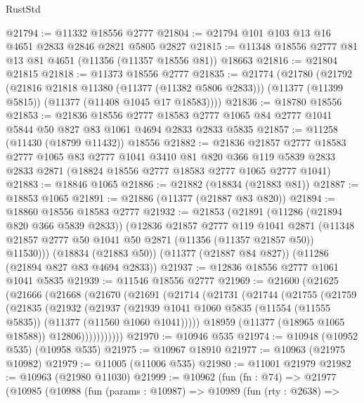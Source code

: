 \begin{lexlean}{RustStd}
\begin{coremodule}
@21794 := @11332 @18556 @2777
@21804 := @21794 @101 @103 @13 @16 @4651 @2833 @2846 @2821 @5805 @2827
@21815 := @11348 @18556 @2777 @81 @13 @81 @4651 (@11356 (@11357 @18556 @81)) @18663
@21816 := @21804 @21815
@21818 := @11373 @18556 @2777
@21835 := @21774
    (@21780
      (@21792
        (@21816 @21818 @11380 (@11377 (@11382 @5806 @2833)))
        (@11377 (@11399 @5815))
        (@11377 (@11408 @1045 @17 @18583))))
@21836 := @18780 @18556
@21853 := @21836
    @18556
    @2777
    @18583
    @2777
    @1065
    @84
    @2777
    @1041
    @5844
    @50
    @827
    @83
    @1061
    @4694
    @2833
    @2833
    @5835
@21857 := @11258 (@11430 (@18799 @11432)) @18556
@21882 := @21836
    @21857
    @2777
    @18583
    @2777
    @1065
    @83
    @2777
    @1041
    @3410
    @81
    @820
    @366
    @119
    @5839
    @2833
    @2833
    @2871
    (@18824 @18556 @2777 @18583 @2777 @1065 @2777 @1041)
@21883 := @18846 @1065
@21886 := @21882 (@18834 (@21883 @81))
@21887 := @18853 @1065
@21891 := @21886 (@11377 (@21887 @83 @820))
@21894 := @18860 @18556 @18583 @2777
@21932 := @21853
    (@21891
      (@11286 (@21894 @820 @366 @5839 @2833))
      (@12836
        @21857
        @2777
        @119
        @1041
        @2871
        (@11348 @21857 @2777 @50 @1041 @50 @2871 (@11356 (@11357 @21857 @50)) @11530)))
    (@18834 (@21883 @50))
    (@11377 (@21887 @84 @827))
    (@11286 (@21894 @827 @83 @4694 @2833))
@21937 := @12836 @18556 @2777 @1061 @1041 @5835
@21939 := @11546 @18556 @2777
@21969 := @21600
    (@21625
      (@21666
        (@21668
          (@21670
            (@21691
              (@21714
                (@21731
                  (@21744
                    (@21755
                      (@21759
                        (@21835
                          (@21932
                            (@21937
                              (@21939
                                @1041
                                @1060
                                @5835
                                (@11554 (@11555 @5835))
                                (@11377 (@11560 @1060 @1041)))))
                          @18959
                          (@11377 (@18965 @1065 @18588))
                          @12806)))))))))))
@21970 := @10946 @535
@21974 := @10948 (@10952 @535) (@10958 @535)
@21975 := @10967 @18910
@21977 := @10963 (@21975 @10982)
@21979 := @11005 (@11006 @535)
@21980 := @11001 @21979
@21982 := @10963 (@21980 @11030)
@21999 := @10962
    (fun (fn : @74) =>
    @21977
      (@10985
        (@10988
          (fun (params : @10987) =>
          @10989
            (fun (rty : @2638) =>

\end{coremodule}
\end{lexlean}
